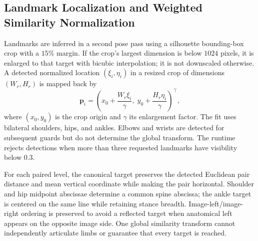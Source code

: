 \subsection{Landmark Localization and Weighted Similarity Normalization}
\label{subsec:procrustes}
Landmarks are inferred in a second pose pass using a silhouette bounding-box crop with a $15\%$ margin. If the crop's largest dimension is below $1024$ pixels, it is enlarged to that target with bicubic interpolation; it is not downscaled otherwise. A detected normalized location $(\xi_i,\eta_i)$ in a resized crop of dimensions $(W_r,H_r)$ is mapped back by
\begin{equation}
\mathbf p_i=\left(x_0+\frac{W_r\xi_i}{\gamma},\;y_0+\frac{H_r\eta_i}{\gamma}\right)^\top,
\end{equation}
where $(x_0,y_0)$ is the crop origin and $\gamma$ its enlargement factor. The fit uses bilateral shoulders, hips, and ankles. Elbows and wrists are detected for subsequent guards but do not determine the global transform. The runtime rejects detections when more than three requested landmarks have visibility below $0.3$.

For each paired level, the canonical target preserves the detected Euclidean pair distance and mean vertical coordinate while making the pair horizontal. Shoulder and hip midpoint abscissae determine a common spine abscissa; the ankle target is centered on the same line while retaining stance breadth. Image-left/image-right ordering is preserved to avoid a reflected target when anatomical left appears on the opposite image side. One global similarity transform cannot independently articulate limbs or guarantee that every target is reached.

